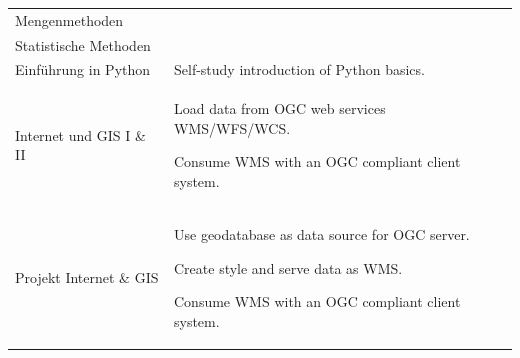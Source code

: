 \documentclass[11pt, a4paper, oneside, parskip=full-]{scrartcl}
\begin{document}
\begin{table}[!htbp]
\begin{tabularx}{\textwidth}{lX}
    \cmidrule(r){1-1} Mengenmethoden &  \\
    \cmidrule(r){1-1} Statistische Methoden &  \\
    \midrule
    Einführung in Python & Self-study introduction of Python basics. \\
    \midrule
    Internet und GIS I \& II &
      \begin{itemize}[left=0pt,nosep,before={\begin{minipage}[t]{\hsize}},after
      ={\end{minipage}}]
      \item Load data from OGC web services WMS/WFS/WCS.
      \item Consume WMS with an OGC compliant client system.
      \end{itemize}\nointerlineskip \\
    \midrule
    Projekt Internet \& GIS &
      \begin{itemize}[left=0pt,nosep,before={\begin{minipage}[t]{\hsize}},after
      ={\end{minipage}}]
      \item Use geodatabase as data source for OGC server.
      \item Create style and serve data as WMS.
      \item Consume WMS with an OGC compliant client system.
      \end{itemize}\nointerlineskip \\
    \bottomrule
  \end{tabularx}%
\end{table}%

\end{document}
